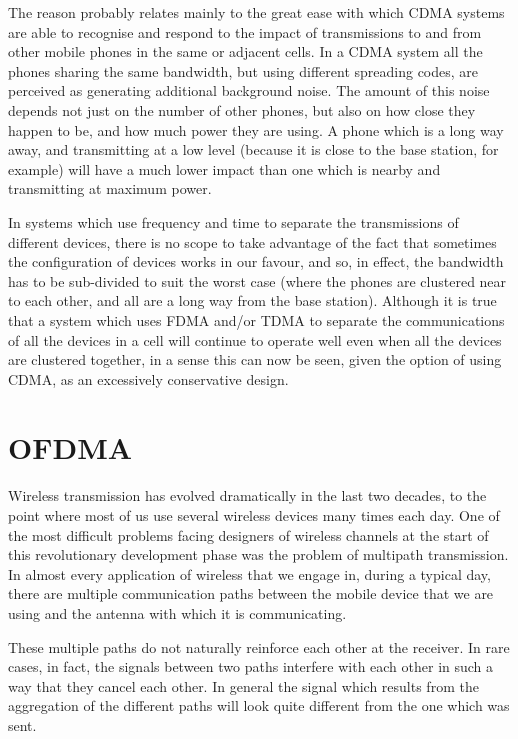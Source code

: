The reason probably relates mainly to the great ease with which CDMA
systems are able to recognise and respond to the impact of transmissions
to and from other mobile phones in the same or adjacent cells. In a CDMA
system all the phones sharing the same bandwidth, but using different
spreading codes, are perceived as generating additional background noise.
The amount of this noise depends not just on the number of other phones,
but also on how close they happen to be, and how much power they are
using. A phone which is a long way away, and transmitting at a low level
(because it is close to the base station, for example) will have a much
lower impact than one which is nearby and transmitting at maximum power.

In systems which use frequency and time to separate the transmissions
of different devices, there is no scope to take advantage of the fact
that sometimes the configuration of devices works in our favour, and so,
in effect, the bandwidth has to be sub-divided to suit the worst case
(where the phones are clustered near to each other, and all are a long
way from the base station). Although it is true that a system which
uses FDMA and/or TDMA to separate the communications of all the devices
in a cell will continue to operate well even when all the devices are
clustered together, in a sense this can now be seen, given the option
of using CDMA, as an excessively conservative design.


\section{OFDMA}

Wireless transmission has evolved dramatically in the last two decades, to the point where
most of us use several wireless devices many times each day. One of the most difficult
problems facing designers of wireless channels at the start of this revolutionary development
phase was the problem of multipath transmission. In almost every application of wireless
that we engage in, during a typical day, there are multiple communication paths between the
mobile device that we are using and the antenna with which it is communicating.

These multiple paths do not naturally reinforce each other at the receiver. In rare cases, in
fact, the signals between two paths interfere with each other in such a way that they cancel
each other. In general the signal which results from the aggregation of the different paths will
look quite different from the one which was sent.

